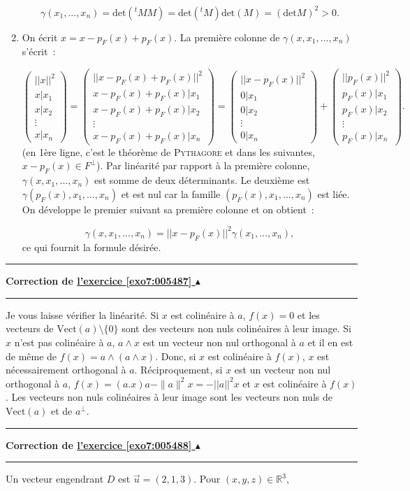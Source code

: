 \documentclass[11pt,a4paper]{article}
\newcommand{\Rr}{\mathbb{R}} \newcommand{\R}{\mathbb{R}}
\newcounter{exo}
\newcommand{\correction}[1]{\hypertarget{cor7:#1}{}\label{cor7:#1}{\bf Correction de \hyperlink{exo7:#1}{l'exercice \ref{exo7:#1} $\blacktriangle$}}\vspace{1mm}\hrule\vspace{1mm}}
\newcommand{\fincorrection}{\vspace{1mm}\hrule\vspace*{7mm}}
\begin{document}
\begin{enumerate}
$$\gamma(x_1,...,x_n)=\mbox{det}({^t}MM)=\mbox{det}({^t}M)\mbox{det}(M)=(\mbox{det}M)^2>0.$$

 \item  On écrit $x=x-p_F(x)+p_F(x)$. La première colonne de $\gamma(x,x_1,...,x_n)$ s'écrit~:

$$\left(
\begin{array}{c}
||x||^2\\
x|x_1\\
x|x_2\\
\vdots\\
x|x_n
\end{array}
\right)=\left(
\begin{array}{c}
||x-p_F(x)+p_F(x)||^2\\
x-p_F(x)+p_F(x)|x_1\\
x-p_F(x)+p_F(x)|x_2\\
\vdots\\
x-p_F(x)+p_F(x)|x_n
\end{array}
\right)=\left(
\begin{array}{c}
||x-p_F(x)||^2\\
0|x_1\\
0|x_2\\
\vdots\\
0|x_n
\end{array}
\right)+\left(
\begin{array}{c}
||p_F(x)||^2\\
p_F(x)|x_1\\
p_F(x)|x_2\\
\vdots\\
p_F(x)|x_n
\end{array}
\right).$$  
(en 1ère ligne, c'est le théorème de \textsc{Pythagore} et dans les suivantes, $x-p_F(x)\in F^\bot$). Par linéarité par rapport à la première colonne, $\gamma(x,x_1,...,x_n)$ est somme de deux déterminants. Le deuxième est  $\gamma(p_F(x),x_1,...,x_n)$ et est nul car la famille $(p_F(x),x_1,...,x_n)$ est liée. On développe le premier suivant sa première colonne et on obtient~:

$$\gamma(x,x_1,...,x_n)=||x-p_F(x)||^2\gamma(x_1,...,x_n),$$
ce qui fournit la formule désirée.

\begin{center}
\end{center}
\end{enumerate}
\fincorrection
\correction{005487}
Je vous laisse vérifier la linéarité.
Si $x$ est colinéaire à $a$, $f(x)=0$ et les vecteurs de $\mbox{Vect}(a)\setminus\{0\}$ sont des vecteurs non nuls colinéaires à leur image.
Si $x$ n'est pas colinéaire à $a$, $a\wedge x$ est un vecteur non nul orthogonal à $a$ et il en est de même de $f(x)=a\wedge(a\wedge x)$. Donc, si $x$ est colinéaire à $f(x)$, $x$ est nécessairement orthogonal à $a$.
Réciproquement, si $x$ est un vecteur non nul orthogonal à $a$, $f(x)=(a.x)a-\|a\|^2x=-||a||^2x$ et $x$ est colinéaire à $f(x)$. Les vecteurs non nuls colinéaires à leur image sont les vecteurs non nuls de $\mbox{Vect}(a)$ et de $a^\bot$.
\fincorrection
\correction{005488}
Un vecteur engendrant $D$ est $\overrightarrow{u}=(2,1,3)$. Pour $(x,y,z)\in\Rr^3$,
\end{document}
